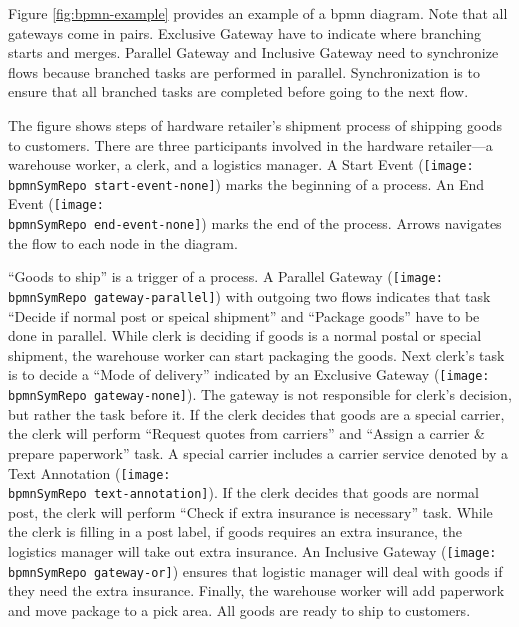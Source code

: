 Figure \ref{fig:bpmn-example} provides an example of a \gls{bpmn} diagram.
Note that all gateways come in pairs.
Exclusive Gateway have to indicate where branching starts and merges.
Parallel Gateway and Inclusive Gateway need to synchronize flows because branched tasks are performed in parallel.
Synchronization is to ensure that all branched tasks are completed before going to the next flow.

The figure shows steps of hardware retailer's shipment process of shipping goods to customers.
There are three participants involved in the hardware retailer---a warehouse worker, a clerk, and a logistics manager.
A Start Event (\texttt{[image: \\bpmnSymRepo start-event-none]}) marks the beginning of a process.
An End Event (\texttt{[image: \\bpmnSymRepo end-event-none]}) marks the end of the process.
Arrows navigates the flow to each node in the diagram.

\enquote{Goods to ship} is a trigger of a process.
A Parallel Gateway (\texttt{[image: \\bpmnSymRepo gateway-parallel]}) with outgoing two flows indicates that task \enquote{Decide if normal post or speical shipment} and \enquote{Package goods} have to be done in parallel.
While clerk is deciding if goods is a normal postal or special shipment, the warehouse worker can start packaging the goods.
Next clerk's task is to decide a \enquote{Mode of delivery} indicated by an Exclusive Gateway (\texttt{[image: \\bpmnSymRepo gateway-none]}).
The gateway is not responsible for clerk's decision, but rather the task before it.
If the clerk decides that goods are a special carrier, the clerk will perform \enquote{Request quotes from carriers} and \enquote{Assign a carrier \& prepare paperwork} task.
A special carrier includes a carrier service denoted by a Text Annotation (\texttt{[image: \\bpmnSymRepo text-annotation]}).
If the clerk decides that goods are normal post, the clerk will perform \enquote{Check if extra insurance is necessary} task.
While the clerk is filling in a post label, if goods requires an extra insurance, the logistics manager will take out extra insurance.
An Inclusive Gateway (\texttt{[image: \\bpmnSymRepo gateway-or]}) ensures that logistic manager will deal with goods if they need the extra insurance.
Finally, the warehouse worker will add paperwork and move package to a pick area.
All goods are ready to ship to customers.